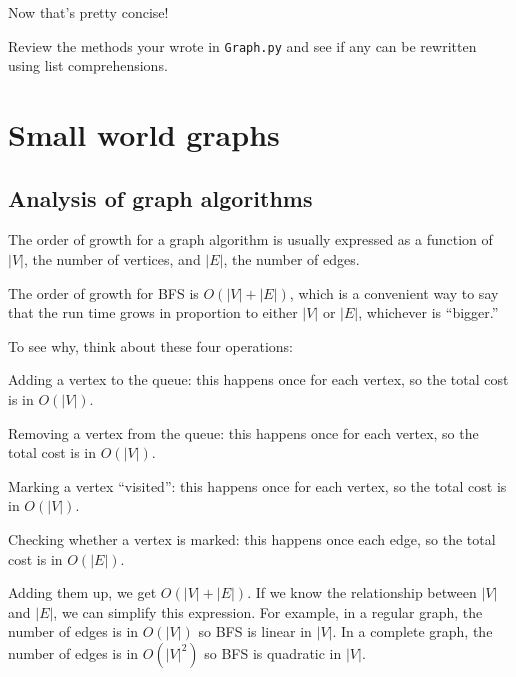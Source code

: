 \documentclass[10pt]{book}
\begin{document}
Now that's pretty concise!

\begin{ex}

Review the methods your wrote in {\tt Graph.py} and see if any
can be rewritten using list comprehensions.

\end{ex}


\chapter{Small world graphs}

\section{Analysis of graph algorithms}

\newcommand{\V}{|V|}
\newcommand{\E}{|E|}

The order of growth for a graph algorithm is usually expressed
as a function of $\V$, the number of vertices, and $\E$, the number
of edges.

The order of growth for BFS is $O(\V + \E)$, which is a convenient
way to say that the run time grows in proportion to either $\V$ or
$\E$, whichever is ``bigger.''

To see why, think about these four operations: 

\begin{description}

\item Adding a vertex to the queue: this happens once for each
vertex, so the total cost is in $O(\V)$.

\item Removing a vertex from the queue: this happens once for each
vertex, so the total cost is in $O(\V)$.

\item Marking a vertex ``visited'': this happens once for each
vertex, so the total cost is in $O(\V)$.

\item Checking whether a vertex is marked: this happens once each
edge, so the total cost is in $O(\E)$.

\end{description}

Adding them up, we get $O(\V + \E)$.  If we know the relationship
between $\V$ and $\E$, we can simplify this expression.  For
example, in a regular graph, the number of edges is in $O(\V)$ so BFS
is linear in $\V$.  In a complete graph, the number of edges is in
$O(\V^2)$ so BFS is quadratic in $\V$.
\end{document}
